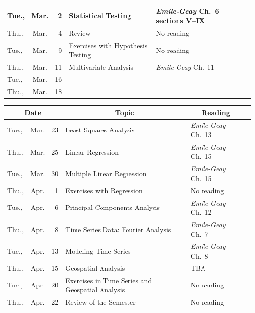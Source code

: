 \documentclass[11pt,twoside]{jgsyllabus}\usepackage[]{graphicx}\usepackage[]{xcolor}
\begin{document}
\begin{center}
\begin{tabular}{l@{~}c@{~}r>{\raggedright}m{2.6in}>{\centering}m{2in}c}
   \midrule
Tue., & Mar. &   2 & Statistical Testing & \emph{Emile-Geay\/} Ch.~6 sections V--IX &  \\ 
   \midrule
Thu., & Mar. &   4 & Review & No reading &  \\ 
   \midrule
Tue., & Mar. &   9 & Exercises with Hypothesis Testing & No reading &  \\ 
   \midrule
Thu., & Mar. &  11 & Multivariate Analysis & \emph{Emile-Geay\/} Ch.~11 &  \\ 
   \midrule
Tue., & Mar. &  16 & \multicolumn{2}{l}{\multirow{2}{*}{\bfseries\scshape\Large Spring Break}} & \\%
  Thu., & Mar. &  18 &  &  &  \\ 
   \bottomrule
\end{tabular}

\end{center}
\clearpage

\begin{center}
\begin{tabular}{l@{~}c@{~}r>{\raggedright}m{2.6in}>{\centering}m{2in}c}
  \toprule
  \multicolumn{3}{c}{\bfseries Date} & \multicolumn{1}{c}{\bfseries Topic} &\multicolumn{1}{c}{\bfseries Reading} &\\
 \midrule
Tue., & Mar. &  23 & Least Squares Analysis & \emph{Emile-Geay\/} Ch.~13 &  \\ 
   \midrule
Thu., & Mar. &  25 & Linear Regression & \emph{Emile-Geay\/} Ch.~15 &  \\ 
   \midrule
Tue., & Mar. &  30 & Multiple Linear Regression & \emph{Emile-Geay\/} Ch.~15 &  \\ 
   \midrule
Thu., & Apr. &   1 & Exercises with Regression & No reading &  \\ 
   \midrule
Tue., & Apr. &   6 & Principal Components Analysis & \emph{Emile-Geay\/} Ch.~12 &  \\ 
   \midrule
Thu., & Apr. &   8 & Time Series Data: Fourier Analysis & \emph{Emile-Geay\/} Ch.~7 &  \\ 
   \midrule
Tue., & Apr. &  13 & Modeling Time Series & \emph{Emile-Geay\/} Ch.~8 &  \\ 
   \midrule
Thu., & Apr. &  15 & Geospatial Analysis & TBA &  \\ 
   \midrule
Tue., & Apr. &  20 & Exercises in Time Series and Geospatial Analysis & No reading &  \\ 
   \midrule
Thu., & Apr. &  22 & Review of the Semester & No reading &  \\ 
   \bottomrule
\end{tabular}

\end{center}
%
\end{document}
